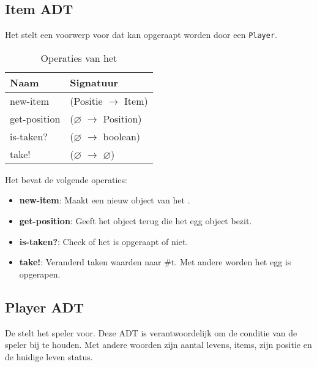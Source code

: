 \subsection{Item ADT}
\label{section:item}

Het \texttt{} stelt een voorwerp voor dat kan opgeraapt  worden door een \texttt{Player}.

\begin{table}[hbt]
\centering
\begin{tabular}{|ll|}
\hline
\rowcolor[HTML]{000000} 
{\color[HTML]{FFFFFF} \textbf{Naam}} & {\color[HTML]{FFFFFF} \textbf{Signatuur}} \\ \hline
new-item                              & (Positie $\rightarrow$ Item) \\ \hline
get-position         & ($\varnothing$ $\rightarrow$ Position)                        \\ \hline
is-taken?                         & ($\varnothing$ $\rightarrow$ boolean)               \\ \hline
take!                              & ($\varnothing$ $\rightarrow$ $\varnothing$)                   \\ \hline
\end{tabular}
\caption{Operaties van het \texttt{}}
\label{table:item}
\end{table}

Het \texttt{} bevat de volgende operaties:

\begin{itemize}
	\item \textbf{new-item}: Maakt een nieuw object van het \texttt{}.
	\item \textbf{get-position}: Geeft het \texttt{} object terug die het egg object bezit.
	\item \textbf{is-taken?}: Check of het \texttt{} is opgeraapt of niet.
	\item \textbf{take!}: Veranderd taken waarden naar \#t.
		Met andere worden het egg is opgerapen.
\end{itemize}

\subsection{Player ADT}
\label{section:player}
De \texttt{} stelt het speler voor.
Deze ADT is verantwoordelijk om de conditie van de speler bij te houden.
Met andere woorden zijn aantal levens, items, zijn positie en de huidige leven status.

